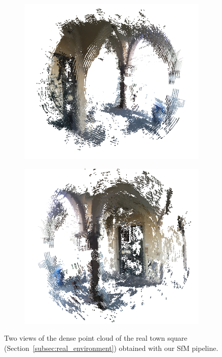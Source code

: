 \begin{figure}[h]
\centering
	\begin{subfigure}{0.45\linewidth}
		\centering
		\includegraphics[width=\linewidth]{img/reconstruction1.png}
	\end{subfigure}
	\begin{subfigure}{0.45\linewidth}
		\centering
		\includegraphics[width=\linewidth]{img/reconstruction2.png}
	\end{subfigure}
	\caption{Two views of the dense point cloud of the real town square
	(Section~\ref{subsec:real_environment}) obtained with our SfM pipeline.}
	\label{fig:real_reconstruction}
\end{figure}
